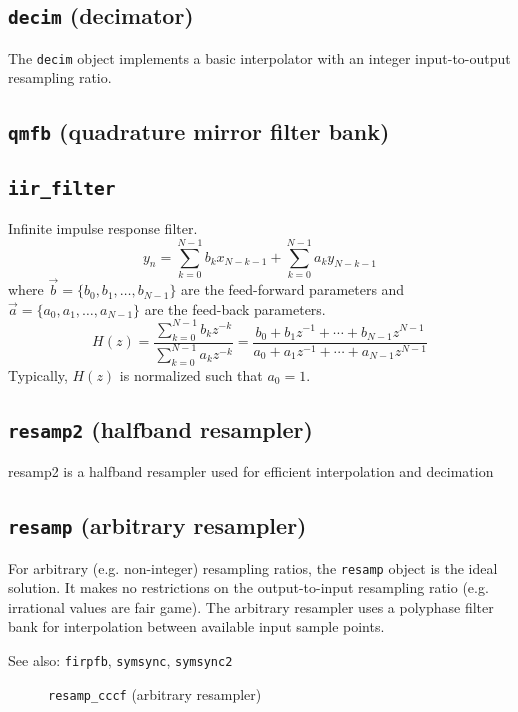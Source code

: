 \subsection{{\tt decim} (decimator)}
The {\tt decim} object implements a basic interpolator with an integer
input-to-output resampling ratio.

\subsection{{\tt qmfb} (quadrature mirror filter bank)}

\subsection{{\tt iir\_filter}}
Infinite impulse response filter.
\[
    y_n = \sum_{k=0}^{N-1}{ b_k x_{N-k-1} } +
          \sum_{k=0}^{N-1}{ a_k y_{N-k-1} }
\]
where $\vec{b} = \{b_0,b_1,\ldots,b_{N-1}\}$ are the feed-forward parameters
and $\vec{a} = \{a_0,a_1,\ldots,a_{N-1}\}$ are the feed-back parameters.
\[
    H(z) = \frac{\sum_{k=0}^{N-1}{b_k z^{-k}}}
                {\sum_{k=0}^{N-1}{a_k z^{-k}}}
         = \frac{ b_0 + b_1 z^{-1} + \cdots + b_{N-1} z^{N-1}}
                { a_0 + a_1 z^{-1} + \cdots + a_{N-1} z^{N-1}}
\]
Typically, $H(z)$ is normalized such that $a_0=1$.

\subsection{{\tt resamp2} (halfband resampler)}
resamp2 is a halfband resampler used for efficient interpolation and
decimation

\subsection{{\tt resamp} (arbitrary resampler)}
For arbitrary (e.g. non-integer) resampling ratios, the {\tt resamp} object is
the ideal solution.
It makes no restrictions on the output-to-input resampling ratio (e.g.
irrational values are fair game).
The arbitrary resampler uses a polyphase filter bank for interpolation between
available input sample points.

See also: {\tt firpfb}, {\tt symsync}, {\tt symsync2}

\begin{figure}
\centering
{}
\caption{{\tt resamp\_cccf} (arbitrary resampler)}
\label{fig:module:filter:resamp_cccf}
\end{figure}


